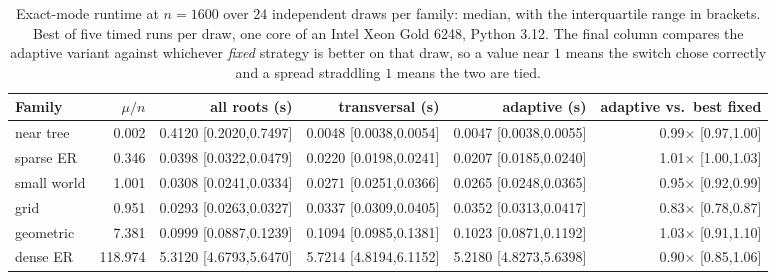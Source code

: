 
\begin{table}[ht]
\centering
\footnotesize
\setlength{\tabcolsep}{4pt}
\begin{tabular}{|l|r|r|r|r|r|}
\hline
\textbf{Family} & $\mu/n$ & \textbf{all roots (s)} & \textbf{transversal (s)} & \textbf{adaptive (s)} & \textbf{adaptive vs.\ best fixed} \\ \hline
near tree      & 0.002 & 0.4120 \tiny[0.2020,0.7497] & 0.0048 \tiny[0.0038,0.0054] & 0.0047 \tiny[0.0038,0.0055] & 0.99$\times$ \tiny[0.97,1.00] \\ \hline
sparse ER      & 0.346 & 0.0398 \tiny[0.0322,0.0479] & 0.0220 \tiny[0.0198,0.0241] & 0.0207 \tiny[0.0185,0.0240] & 1.01$\times$ \tiny[1.00,1.03] \\ \hline
small world    & 1.001 & 0.0308 \tiny[0.0241,0.0334] & 0.0271 \tiny[0.0251,0.0366] & 0.0265 \tiny[0.0248,0.0365] & 0.95$\times$ \tiny[0.92,0.99] \\ \hline
grid           & 0.951 & 0.0293 \tiny[0.0263,0.0327] & 0.0337 \tiny[0.0309,0.0405] & 0.0352 \tiny[0.0313,0.0417] & 0.83$\times$ \tiny[0.78,0.87] \\ \hline
geometric      & 7.381 & 0.0999 \tiny[0.0887,0.1239] & 0.1094 \tiny[0.0985,0.1381] & 0.1023 \tiny[0.0871,0.1192] & 1.03$\times$ \tiny[0.91,1.10] \\ \hline
dense ER       & 118.974 & 5.3120 \tiny[4.6793,5.6470] & 5.7214 \tiny[4.8194,6.1152] & 5.2180 \tiny[4.8273,5.6398] & 0.90$\times$ \tiny[0.85,1.06] \\ \hline
\end{tabular}
\caption{Exact-mode runtime at $n=1600$ over $24$ independent draws per family: median, with the interquartile range in
brackets. Best of five timed runs per draw, one core of an Intel Xeon Gold 6248,
Python 3.12. The final column compares the adaptive variant against whichever
\emph{fixed} strategy is better on that draw, so a value near $1$ means the
switch chose correctly and a spread straddling $1$ means the two are tied.}
\label{tab:runtime}
\end{table}
